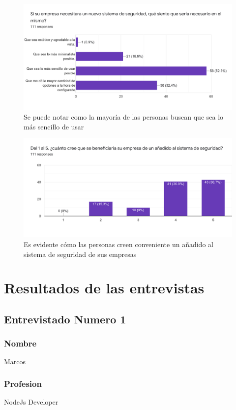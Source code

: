 \documentclass{article}
\begin{document}
\begin{figure}[H]
	\includegraphics[width=\textwidth]{4.png}
	\centering
	\caption{Se puede notar como la mayoría de las personas buscan que sea lo más sencillo de usar}
\end{figure}
\begin{figure}[H]
	\includegraphics[width=\textwidth]{5.png}
	\centering
	\caption{Es evidente cómo las personas creen conveniente un añadido al sistema de seguridad de sus empresas}
\end{figure}

\section{Resultados de las entrevistas}
\subsection{Entrevistado Numero 1}
\subsubsection{Nombre}
Marcos

\subsubsection{Profesion}
NodeJs Developer
\end{document}
